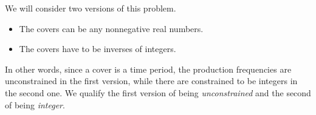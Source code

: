 We will consider two versions of this problem.
\begin{itemize}
  \item The covers can be any nonnegative real numbers.
  \item The covers have to be inverses of integers.
\end{itemize}
In other words, since a cover is a time period, the production frequencies are unconstrained in the first version, while there are constrained to be integers in the second one. We qualify the first version of being {\em unconstrained} and the second of being {\em integer}.

















